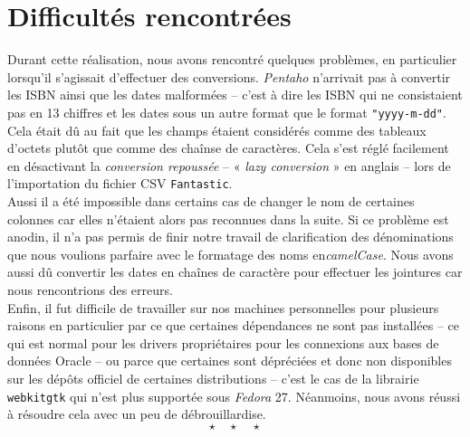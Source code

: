 \section{Difficultés rencontrées}

	Durant cette réalisation, nous avons rencontré quelques problèmes, en particulier lorsqu'il s'agissait d'effectuer des conversions. \textit{Pentaho} n'arrivait pas à convertir les ISBN ainsi que les dates malformées -- c'est à dire les ISBN qui ne consistaient pas en 13 chiffres et les dates sous un autre format que le format \texttt{"yyyy-m-dd"}. Cela était dû au fait que les champs étaient considérés comme des tableaux d'octets plutôt que comme des chaînse de caractères. Cela s'est réglé facilement en désactivant la \textit{conversion repoussée} -- « \textit{lazy conversion} » en anglais -- lors de l'importation du fichier CSV \texttt{Fantastic}.\\
	
	Aussi il a été impossible dans certains cas de changer le nom de certaines colonnes car elles n'étaient alors pas reconnues dans la suite. Si ce problème est anodin, il n'a pas permis de finir notre travail de clarification des dénominations que nous voulions parfaire avec le formatage des noms en\textit{camelCase}. Nous avons aussi dû convertir les dates en chaînes de caractère pour effectuer les jointures car nous rencontrions des erreurs.\\
	
	Enfin, il fut difficile de travailler sur nos machines personnelles pour plusieurs raisons en particulier par ce que certaines dépendances ne sont pas installées -- ce qui est normal pour les drivers propriétaires pour les connexions aux bases de données Oracle -- ou parce que certaines sont dépréciées et donc non disponibles sur les dépôts officiel de certaines distributions -- c'est le cas de la librairie \texttt{webkitgtk} qui n'est plus supportée sous \textit{Fedora} 27. Néanmoins, nous avons réussi à résoudre cela avec un peu de débrouillardise.\\
	
	\[ \star \quad \star \quad \star \]
  
\newpage
\nocite{*}
%


%
%

%

